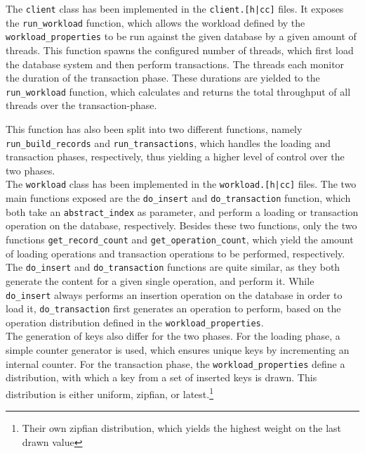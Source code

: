 \documentclass[11pt]{article} %
\begin{document}
The \verb|client| class has been implemented in the \verb=client.[h|cc]= files. It exposes the \verb|run_workload| function, which allows the workload defined by the \verb|workload_properties| to be run against the given database by a given amount of threads. This function spawns the configured number of threads, which first load the database system and then perform transactions. The threads each monitor the duration of the transaction phase. These durations are yielded to the \verb|run_workload| function, which calculates and returns the total throughput of all threads over the transaction-phase. 

This function has also been split into two different functions, namely \verb|run_build_records| and \verb|run_transactions|, which handles the loading and transaction phases, respectively, thus yielding a higher level of control over the two phases. \\

The \verb|workload| class has been implemented in the \verb=workload.[h|cc]= files. The two main functions exposed are the \verb|do_insert| and \verb|do_transaction| function, which both take an \verb|abstract_index| as parameter, and perform a loading or transaction operation on the database, respectively. Besides these two functions, only the two functions \verb|get_record_count| and \verb|get_operation_count|, which yield the amount of loading operations and transaction operations to be performed, respectively. \\

The \verb|do_insert| and \verb|do_transaction| functions are quite similar, as they both generate the content for a given single operation, and perform it. While \verb|do_insert| always performs an insertion operation on the database in order to load it, \verb|do_transaction| first generates an operation to perform, based on the operation distribution defined in the \verb|workload_properties|. \\

The generation of keys also differ for the two phases. For the loading phase, a simple counter generator is used, which ensures unique keys by incrementing an internal counter. For the transaction phase, the \verb|workload_properties| define a distribution, with which a key from a set of inserted keys is drawn. This distribution is either uniform, zipfian, or latest.\footnote{Their own zipfian distribution, which yields the highest weight on the last drawn value} \\
\end{document}
